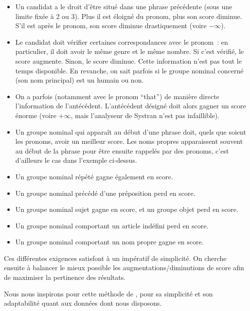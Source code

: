 \documentclass[a4paper, 12pt]{article}
\begin{document}
\begin{itemize}
 \item Un candidat a le droit d'être situé dans une phrase précédente (sous une limite fixée à 2 ou 3). Plus il est éloigné du pronom, plus son score diminue. S'il est après le pronom, son score diminue drastiquement (voire $-\infty$).
 \item Le candidat doit vérifier certaines correspondances avec le pronom~: en particulier, il doit avoir le même genre et le même nombre. Si c'est vérifié, le score augmente. Sinon, le score diminue. Cette information n'est pas tout le temps disponible. En revanche, on sait parfois si le groupe nominal concerné (son nom principal) est un humain ou non.
 \item On a parfois (notamment avec le pronom ``that'') de manière directe l'information de l'antécédent. L'antécédent désigné doit alors gagner un score énorme (voire $+\infty$, mais l'analyseur de Systran n'est pas infaillible).
 \item Un groupe nominal qui apparaît au début d'une phrase doit, quels que soient les pronoms, avoir un meilleur score. Les noms propres apparaissent souvent au début de la phrase pour être ensuite rappelés par des pronoms, c'est d'ailleurs le cas dans l'exemple ci-dessus.
 \item Un groupe nominal répété gagne également en score.
 \item Un groupe nominal précédé d'une préposition perd en score.
 \item Un groupe nominal sujet gagne en score, et un groupe objet perd en score. 
 \item Un groupe nominal comportant un article indéfini perd en score.
 \item Un groupe nominal comportant un nom propre gagne en score.
\end{itemize}

Ces différentes exigences satisfont à un impératif de simplicité. On cherche ensuite à balancer le mieux possible les augmentations/diminutions de score afin de maximiser la pertinence des résultats.

Nous nous inspirons pour cette méthode de \cite{Mitkov:1998:RPR:980691.980712}, pour sa simplicité et son adaptabilité quant aux données dont nous disposons.




\end{document}
